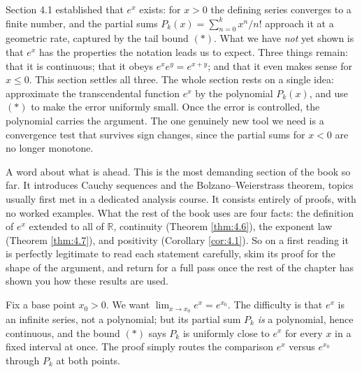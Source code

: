 \documentclass[a4paper,12pt,oneside]{memoir}
\begin{document}
Section 4.1 established that \(e^{x}\) exists: for \(x > 0\) the defining series converges to a finite number, and the partial sums \(P_{k}(x) = \sum_{n=0}^{k} x^{n}/n!\) approach it at a geometric rate, captured by the tail bound \((*)\). What we have \emph{not} yet shown is that \(e^{x}\) has the properties the notation leads us to expect. Three things remain: that it is continuous; that it obeys \(e^{x} e^{y} = e^{x + y}\); and that it even makes sense for \(x \le 0\). This section settles all three. The whole section rests on a single idea: approximate the transcendental function \(e^{x}\) by the polynomial \(P_{k}(x)\), and use \((*)\) to make the error uniformly small. Once the error is controlled, the polynomial carries the argument. The one genuinely new tool we need is a convergence test that survives sign changes, since the partial sums for \(x < 0\) are no longer monotone.

A word about what is ahead. This is the most demanding section of the book so far. It introduces Cauchy sequences and the Bolzano–Weierstrass theorem, topics usually first met in a dedicated analysis course. It consists entirely of proofs, with no worked examples. What the rest of the book uses are four facts: the definition of \(e^{x}\) extended to all of \(\mathbb{R}\), continuity (Theorem \ref{thm:4.6}), the exponent law (Theorem \ref{thm:4.7}), and positivity (Corollary \ref{cor:4.1}). So on a first reading it is perfectly legitimate to read each statement carefully, skim its proof for the shape of the argument, and return for a full pass once the rest of the chapter has shown you how these results are used.

Fix a base point \(x_{0} > 0\). We want \(\lim_{x \to x_{0}} e^{x} = e^{x_{0}}\). The difficulty is that \(e^{x}\) is an infinite series, not a polynomial; but its partial sum \(P_{k}\) \emph{is} a polynomial, hence continuous, and the bound \((*)\) says \(P_{k}\) is uniformly close to \(e^{x}\) for every \(x\) in a fixed interval at once. The proof simply routes the comparison \(e^{x}\) versus \(e^{x_{0}}\) through \(P_{k}\) at both points.
\end{document}
